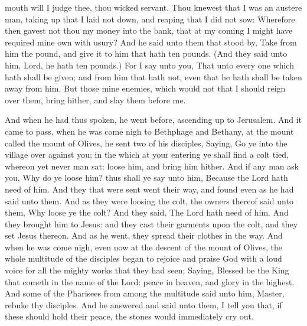 mouth will I judge thee, thou wicked servant. Thou knewest that I was an
austere man, taking up that I laid not down, and reaping that I did not
sow:  Wherefore then gavest not thou my money into the
bank, that at my coming I might have required mine own with usury?
 And he said unto them that stood by, Take from him the
pound, and give it to him that hath ten pounds.  (And they
said unto him, Lord, he hath ten pounds.)  For I say unto
you, That unto every one which hath shall be given; and from him that
hath not, even that he hath shall be taken away from him. 
But those mine enemies, which would not that I should reign over them,
bring hither, and slay them before me.

 And when he had thus spoken, he went before, ascending up
to Jerusalem.  And it came to pass, when he was come nigh
to Bethphage and Bethany, at the mount called the mount of Olives, he
sent two of his disciples,  Saying, Go ye into the village
over against you; in the which at your entering ye shall find a colt
tied, whereon yet never man sat: loose him, and bring him hither.
 And if any man ask you, Why do ye loose him? thus shall ye
say unto him, Because the Lord hath need of him.  And they
that were sent went their way, and found even as he had said unto them.
 And as they were loosing the colt, the owners thereof said
unto them, Why loose ye the colt?  And they said, The Lord
hath need of him.  And they brought him to Jesus: and they
cast their garments upon the colt, and they set Jesus thereon.
 And as he went, they spread their clothes in the way.
 And when he was come nigh, even now at the descent of the
mount of Olives, the whole multitude of the disciples began to rejoice
and praise God with a loud voice for all the mighty works that they had
seen;  Saying, Blessed be the King that cometh in the name
of the Lord: peace in heaven, and glory in the highest. 
And some of the Pharisees from among the multitude said unto him,
Master, rebuke thy disciples.  And he answered and said
unto them, I tell you that, if these should hold their peace, the stones
would immediately cry out.

